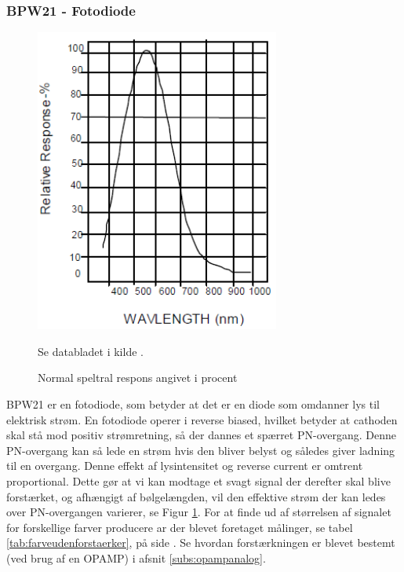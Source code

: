 \subsubsection{BPW21 - Fotodiode}
\begin{figure}[H]
	\centering
    \includegraphics[height=10cm]{figures/komponenter/photosensor}
	\caption{Normal speltral respons angivet i procent}
	\label{fig:spektrum}
	Se databladet i kilde \cite{kompPhoto}.
\end{figure}
BPW21 er en fotodiode, som betyder at det er en diode som omdanner lys til elektrisk strøm. 
En fotodiode operer i reverse biased, hvilket betyder at cathoden skal stå mod positiv strømretning, så der dannes et spærret PN-overgang. Denne PN-overgang kan så lede en strøm hvis den bliver belyst og således giver ladning til en overgang. Denne effekt af lysintensitet og reverse current er omtrent proportional. Dette gør at vi kan modtage et svagt signal der derefter skal blive forstærket, og afhængigt af bølgelængden, vil den effektive strøm der kan ledes over PN-overgangen varierer, se Figur \ref{fig:spektrum}. For at finde ud af størrelsen af signalet for forskellige farver producere ar der blevet foretaget målinger, se tabel \ref{tab:farveudenforstaerker}, på side \pageref{tab:farveudenforstaerker}. Se hvordan forstærkningen er blevet bestemt (ved brug af en OPAMP) i afsnit \ref{subs:opampanalog}.

